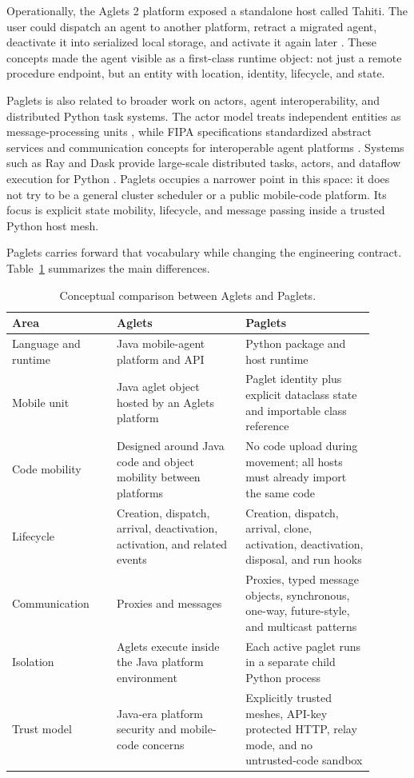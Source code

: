 \documentclass[11pt,a4paper]{article}
\begin{document}
Operationally, the Aglets 2 platform exposed a standalone host called Tahiti.
The user could dispatch an agent to another platform, retract a migrated agent,
deactivate it into serialized local storage, and activate it again later
\cite{ferrari2004manual}. These concepts made the agent visible as a first-class
runtime object: not just a remote procedure endpoint, but an entity with
location, identity, lifecycle, and state.

Paglets is also related to broader work on actors, agent interoperability, and
distributed Python task systems. The actor model treats independent entities as
message-processing units \cite{hewitt1973actor}, while FIPA specifications
standardized abstract services and communication concepts for interoperable
agent platforms \cite{fipa2002abstract}. Systems such as Ray and Dask provide
large-scale distributed tasks, actors, and dataflow execution for Python
\cite{moritz2018ray,rocklin2015dask}. Paglets occupies a narrower point in this
space: it does not try to be a general cluster scheduler or a public
mobile-code platform. Its focus is explicit state mobility, lifecycle, and
message passing inside a trusted Python host mesh.

Paglets carries forward that vocabulary while changing the engineering
contract. Table~\ref{tab:comparison} summarizes the main differences.

\begin{table}[h]
\centering
\caption{Conceptual comparison between Aglets and Paglets.}
\label{tab:comparison}
\begin{tabular}{p{0.26\linewidth}p{0.32\linewidth}p{0.32\linewidth}}
\toprule
Area & Aglets & Paglets \\
\midrule
Language and runtime & Java mobile-agent platform and API & Python package and host runtime \\
Mobile unit & Java aglet object hosted by an Aglets platform & Paglet identity plus explicit dataclass state and importable class reference \\
Code mobility & Designed around Java code and object mobility between platforms & No code upload during movement; all hosts must already import the same code \\
Lifecycle & Creation, dispatch, arrival, deactivation, activation, and related events & Creation, dispatch, arrival, clone, activation, deactivation, disposal, and run hooks \\
Communication & Proxies and messages & Proxies, typed message objects, synchronous, one-way, future-style, and multicast patterns \\
Isolation & Aglets execute inside the Java platform environment & Each active paglet runs in a separate child Python process \\
Trust model & Java-era platform security and mobile-code concerns & Explicitly trusted meshes, API-key protected HTTP, relay mode, and no untrusted-code sandbox \\
\bottomrule
\end{tabular}
\end{table}
\end{document}

